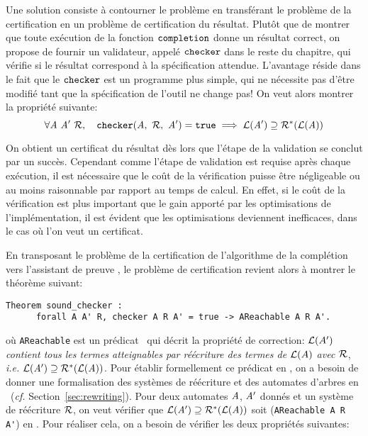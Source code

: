 Une solution consiste à contourner le problème en transférant le problème de la certification en un problème
de certification du résultat. Plutôt que de montrer que toute exécution de la fonction $\mathtt{completion}$ donne un résultat
correct, on propose de fournir un validateur, appelé $\mathtt{checker}$ dans le reste du chapitre, qui vérifie si le résultat correspond
à la spécification attendue. L'avantage réside dans le fait que le $\mathtt{checker}$ est un programme plus simple, qui ne nécessite pas d'être modifié
tant que la spécification de l'outil ne change pas! On veut alors montrer la propriété suivante:
\[\forall \A\ \A'\ \R,\quad \kw{checker}(\A,\ \R,\ \A') = \kw{true} \imp \Lang(\A') \supseteq \R^*(\Lang(\A))\]

On obtient un certificat du résultat dès lors que l'étape de la validation se conclut par un succès.
Cependant comme l'étape de validation est requise après chaque exécution, il est nécessaire que le coût 
de la vérification puisse être négligeable ou au moins raisonnable par rapport au temps de calcul.
En effet, si le coût de la vérification est plus important que le gain apporté par les optimisations 
de l'implémentation, il est évident que les optimisations deviennent inefficaces, dans le cas
où l'on veut un certificat.


En transposant le problème de la certification de l'algorithme de la complétion vers 
l'assistant de preuve \coq, le problème de certification revient alors à montrer le théorème suivant:

\begin{lstlisting}
Theorem sound_checker :
      forall A A' R, checker A R A' = true -> AReachable A R A'.
\end{lstlisting}
où \lstinline!AReachable! est un prédicat \coq\  qui décrit
la propriété de correction: \emph{$\mathcal{L}(A')$ contient tous les termes atteignables
  par réécriture des termes de $\mathcal{L}(A)$ avec $\mathcal R$}, \textit{i.e.} $\mathcal{L}(\mathit A')
\supseteq \mathcal R^*(\mathcal{L}(\mathit A))$. 
Pour établir formellement ce prédicat en \coq, on a besoin de donner une formalisation
des systèmes de réécriture et des automates d'arbres en \coq\ (\textit{cf.} Section~\ref{sec:rewriting}).
Pour deux automates $\mathit A$, $\mathit A'$ donnés et un système de réécriture $\mathcal R$, on veut vérifier 
que $\mathcal{L}(\mathit A')\supseteq \mathcal R^*(\mathcal{L}(\mathit A))$ soit (\lstinline!AReachable A R A'!) en \coq.
Pour réaliser cela, on a besoin de vérifier les deux propriétés suivantes:

